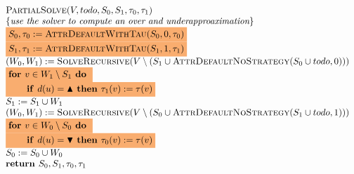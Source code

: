 \documentclass{article}
\newcommand{\If}{\text{\textbf{if }}}
\newcommand{\Do}{\text{\textbf{ do }}}
\newcommand{\Then}{\text{\textbf{ then }}}
\newcommand{\For}{\text{\textbf{for }}}
\newcommand{\Return}{\text{\textbf{return }}}
\begin{document}
\begin{equation*}
\begin{array}{l}
\textsc{PartialSolve}(V,todo,S_0,S_1, \tau_0, \tau_1)\\
\{\textit{use the solver to compute an over and underapproaximation}\}\\
\colorbox{Apricot}{$S_0, \tau_0 := \textsc{AttrDefaultWithTau}(S_0, 0, \tau_0)$} \\
\colorbox{Apricot}{$S_1, \tau_1 := \textsc{AttrDefaultWithTau}(S_1, 1, \tau_1)$} \\
(W_0,W_1) := \textsc{SolveRecursive}(V \setminus (S_1 \cup \textsc{AttrDefaultNoStrategy}(S_0 \cup todo,0)))\\

\colorbox{Apricot}{$ \For v \in W_1 \setminus S_{1} \Do $} \\
\colorbox{Apricot}{$ \qquad \If d(u) = \blacktriangle \Then \tau_{1}(v) := \tau(v) $} \\
S_1 := S_1 \cup W_1\\

(W_0,W_1) := \textsc{SolveRecursive}(V \setminus (S_0 \cup \textsc{AttrDefaultNoStrategy}(S_1 \cup todo,1)))\\
\colorbox{Apricot}{$ \For v \in W_0 \setminus S_{0} \Do $} \\
\colorbox{Apricot}{$ \qquad \If d(u) = \blacktriangledown \Then \tau_{0}(v) := \tau(v) $} \\
S_0 := S_0 \cup W_0 \\
\Return S_0, S_1, \tau_0,\tau_1
\end{array}
\end{equation*}
\end{document}
